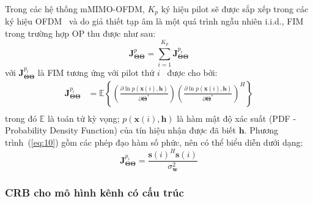 Trong các hệ thống mMIMO-OFDM, $K_p$ ký hiệu pilot sẽ được sắp xếp trong các ký hiệu OFDM~\cite{Garro2020} và do giả thiết tạp âm là một quá trình ngẫu nhiên i.i.d., FIM trong trường hợp OP thu được như sau:
\begin{equation}
\label{eq:9}
    \mathbf{J}_{\boldsymbol{\Theta} \boldsymbol{\Theta}}^{p}=\sum_{i=1}^{K_{p}} \mathbf{J}_{\boldsymbol{\Theta} \boldsymbol{\Theta}}^{p_{i}}
\end{equation}
với $\mathbf{J}_{\boldsymbol{\Theta} \boldsymbol{\Theta}}^{p_{i}}$ là FIM tương ứng với pilot thứ $i$~\cite{Kay1993} được cho bởi:
\begin{equation}
    \label{eq:10}
    \begin{aligned}
        \mathbf{J}_{\boldsymbol{\Theta} \boldsymbol{\Theta}}^{p_{i}} &=\mathbb{E}\left\{\left(\frac{\partial \ln p(\mathbf{x}(i), \mathbf{h})}{\partial \boldsymbol{\Theta}^{*}}\right)\left(\frac{\partial \ln p(\mathbf{x}(i), \mathbf{h})}{\partial \boldsymbol{\Theta}^{*}}\right)^{H}\right\} \\
    \end{aligned}
\end{equation}
trong đó $\mathbb{E}$ là toán tử kỳ vọng; $p(\mathbf{x}(i), \mathbf{h})$ là hàm mật độ xác suất (PDF - Probability Density Function) của tín hiệu nhận được đã biết $\mathbf{h}$. Phương trình~(\ref{eq:10}) gồm các phép đạo hàm số phức, nên có thể biểu diễn dưới dạng:
\begin{equation}
    \mathbf{J}_{\boldsymbol{\Theta} \mathbf{\Theta}}^{p_{i}}=\frac{\mathbf{s}(i)^{H} \mathbf{s}(i)}{\sigma_{\mathbf{w}}^{2}}
\end{equation}

\subsubsection*{\textbf{CRB cho mô hình kênh có cấu trúc}}


